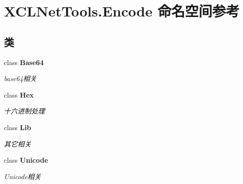 \hypertarget{namespace_x_c_l_net_tools_1_1_encode}{}\section{X\+C\+L\+Net\+Tools.\+Encode 命名空间参考}
\label{namespace_x_c_l_net_tools_1_1_encode}
\subsection*{类}
\begin{DoxyCompactItemize}
\item 
class {\bfseries Base64}
\begin{DoxyCompactList}\small\item\em base64相关 \end{DoxyCompactList}\item 
class {\bfseries Hex}
\begin{DoxyCompactList}\small\item\em 十六进制处理 \end{DoxyCompactList}\item 
class {\bfseries Lib}
\begin{DoxyCompactList}\small\item\em 其它相关 \end{DoxyCompactList}\item 
class {\bfseries Unicode}
\begin{DoxyCompactList}\small\item\em Unicode相关 \end{DoxyCompactList}\end{DoxyCompactItemize}
